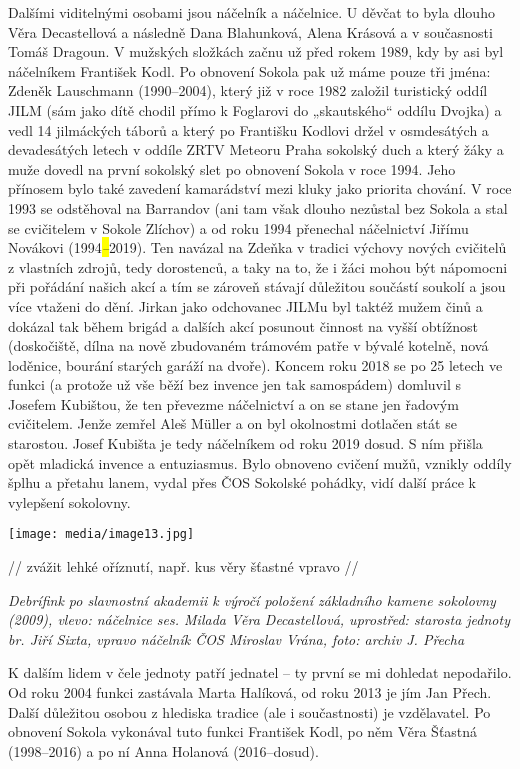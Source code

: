 Dalšími viditelnými osobami jsou náčelník a náčelnice. U děvčat to byla
dlouho Věra Decastellová a následně Dana Blahunková, Alena Krásová a v
současnosti Tomáš Dragoun. V mužských složkách začnu už před rokem 1989,
kdy by asi byl náčelníkem František Kodl. Po obnovení Sokola pak už máme
pouze tři jména: Zdeněk Lauschmann (1990--2004), který již v roce 1982
založil turistický oddíl JILM (sám jako dítě chodil přímo k Foglarovi do
„skautského`` oddílu Dvojka) a vedl 14 jilmáckých táborů a který po
Františku Kodlovi držel v osmdesátých a devadesátých letech v oddíle
ZRTV Meteoru Praha sokolský duch a který žáky a muže dovedl na první
sokolský slet po obnovení Sokola v roce 1994. Jeho přínosem bylo také
zavedení kamarádství mezi kluky jako priorita chování. V roce 1993 se
odstěhoval na Barrandov (ani tam však dlouho nezůstal bez Sokola a stal
se cvičitelem v Sokole Zlíchov) a od roku 1994 přenechal náčelnictví
Jiřímu Novákovi (1994\emph{\hl{--}}2019). Ten navázal na Zdeňka v
tradici výchovy nových cvičitelů z vlastních zdrojů, tedy dorostenců, a
taky na to, že i žáci mohou být nápomocni při pořádání našich akcí a tím
se zároveň stávají důležitou součástí soukolí a jsou více vtaženi do
dění. Jirkan jako odchovanec JILMu byl taktéž mužem činů a dokázal tak
během brigád a dalších akcí posunout činnost na vyšší obtížnost
(doskočiště, dílna na nově zbudovaném trámovém patře v bývalé kotelně,
nová loděnice, bourání starých garáží na dvoře). Koncem roku 2018 se po
25 letech ve funkci (a protože už vše běží bez invence jen tak
samospádem) domluvil s Josefem Kubištou, že ten převezme náčelnictví a
on se stane jen řadovým cvičitelem. Jenže zemřel Aleš Müller a on byl
okolnostmi dotlačen stát se starostou. Josef Kubišta je tedy náčelníkem
od roku 2019 dosud. S ním přišla opět mladická invence a entuziasmus.
Bylo obnoveno cvičení mužů, vznikly oddíly šplhu a přetahu lanem, vydal
přes ČOS Sokolské pohádky, vidí další práce k vylepšení sokolovny.

\texttt{[image: media/image13.jpg]}

// zvážit lehké oříznutí, např. kus věry šťastné vpravo //

\emph{Debrífink po slavnostní akademii k výročí položení základního
kamene sokolovny (2009), vlevo: náčelnice ses. Milada Věra Decastellová,
uprostřed: starosta jednoty br. Jiří Sixta, vpravo náčelník ČOS Miroslav
Vrána, foto: archiv J. Přecha}

K dalším lidem v čele jednoty patří jednatel -- ty první se mi dohledat
nepodařilo. Od roku 2004 funkci zastávala Marta Halíková, od roku 2013
je jím Jan Přech. Další důležitou osobou z hlediska tradice (ale i
součastnosti) je vzdělavatel. Po obnovení Sokola vykonával tuto funkci
František Kodl, po něm Věra Šťastná (1998--2016) a po ní Anna Holanová
(2016--dosud).


